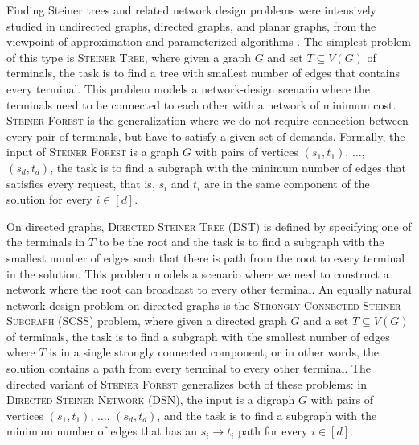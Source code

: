 \documentclass[a4paper,11pt]{article}
\theoremstyle{plain}
\newtheorem{identification rule}{Identification Rule}
\theoremstyle{definition}
\theoremstyle{remark}
\begin{document}
Finding Steiner trees and related network design problems were intensively studied in undirected graphs, directed graphs, and planar graphs, from the viewpoint of approximation and parameterized algorithms \cite{ChitnisFHM20,eiben_et_al,DBLP:conf/stacs/DvorakFKMTV18,rajesh-andreas-pasin,khandekar,FeldmannM16,DBLP:journals/iandc/BermanBMRY13,DBLP:journals/siamdm/GuoNS11,feldman-ruhl,DBLP:journals/jal/CharikarCCDGGL99,winter1987steiner,hakimi,DBLP:journals/jacm/BateniHM11,DBLP:conf/soda/BateniCEHKM11,DBLP:conf/focs/MarxPP18,karp1972reducibility,ramanathan1996multicast,salama1997evaluation,Li1992267,Natu1997207,daniel-grid-tiling,levin}. The simplest problem of this type is \textsc{Steiner Tree}, where given a graph $G$ and set $T\subseteq V(G)$ of terminals, the task is to find a tree with smallest number of edges that contains every terminal. This problem models a network-design scenario where the terminals need to be connected to each other with a network of minimum cost. \textsc{Steiner Forest} is the generalization where we do not require connection between every pair of terminals, but have to satisfy a given set of demands. Formally, the input of \textsc{Steiner Forest} is a graph $G$ with pairs of vertices $(s_1,t_1)$, $\dots$, $(s_d,t_d)$, the task is to find a subgraph with the minimum number of edges that satisfies every request, that is, $s_i$ and $t_i$ are in the same component of the solution for every $i\in [d]$. 

On directed graphs, \textsc{Directed Steiner Tree (DST)} is defined by specifying one of the terminals in $T$ to be the root and the task is to find a subgraph with the smallest number of edges such that there is path from the root to every terminal in the solution. This problem models a scenario where we need to construct a network where the root can broadcast to every other terminal. An equally natural network design problem on directed graphs is the \textsc{Strongly Connected Steiner Subgraph (SCSS)} problem, where given a directed graph $G$ and a set $T\subseteq V(G)$ of terminals, the task is to find a subgraph with the smallest number of edges where $T$ is in a single strongly connected component, or in other words, the solution contains a path from every terminal to every other terminal. The directed variant of \textsc{Steiner Forest} generalizes both of these problems: in \textsc{Directed Steiner Network (DSN)}, the
input is a digraph $G$ with pairs of vertices $(s_1,t_1)$, $\dots$, $(s_d,t_d)$, and the task is to find a subgraph with the minimum number of edges that has an $s_i\to t_i$ path for every $i\in [d]$.
\end{document}
